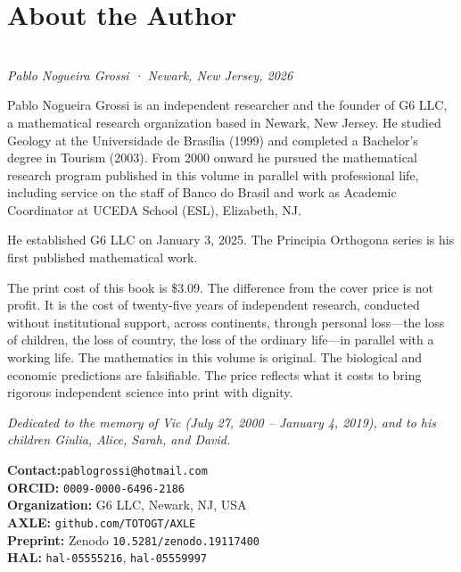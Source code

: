 \documentclass[11pt, twoside, openright]{book}
\theoremstyle{plain}
\theoremstyle{definition}
\begin{document}
\backmatter
\chapter*{About the Author}
\pagestyle{fancy}

\begin{center}
\\[12pt]
{\small\textit{Pablo Nogueira Grossi · Newark, New Jersey, 2026}}
\end{center}

\bigskip
\noindent Pablo Nogueira Grossi is an independent researcher and the
founder of G6 LLC, a mathematical research organization based in
Newark, New Jersey. He studied Geology at the Universidade de Brasília
(1999) and completed a Bachelor's degree in Tourism (2003). From 2000
onward he pursued the mathematical research program published in this
volume in parallel with professional life, including service on the
staff of Banco do Brasil and work as Academic Coordinator at UCEDA
School (ESL), Elizabeth, NJ.

He established G6 LLC on January 3, 2025. The Principia Orthogona
series is his first published mathematical work.

\medskip
The print cost of this book is \$3.09. The difference from the cover
price is not profit. It is the cost of twenty-five years of independent
research, conducted without institutional support, across continents,
through personal loss---the loss of children, the loss of country, the
loss of the ordinary life---in parallel with a working life. The
mathematics in this volume is original. The biological and economic
predictions are falsifiable. The price reflects what it costs to bring
rigorous independent science into print with dignity.

\medskip
\noindent\textit{Dedicated to the memory of Vic (July 27, 2000 --
January 4, 2019), and to his children Giulia, Alice, Sarah, and David.}

\medskip
\begin{tabbing}
\textbf{Contact:}\hspace{1cm}\=\texttt{pablogrossi@hotmail.com}\\
\textbf{ORCID:}     \> \texttt{0009-0000-6496-2186}\\
\textbf{Organization:}\> G6 LLC, Newark, NJ, USA\\
\textbf{AXLE:}      \> \texttt{github.com/TOTOGT/AXLE}\\
\textbf{Preprint:}  \> Zenodo \texttt{10.5281/zenodo.19117400}\\
\textbf{HAL:}       \> \texttt{hal-05555216}, \texttt{hal-05559997}
\end{tabbing}
\end{document}

